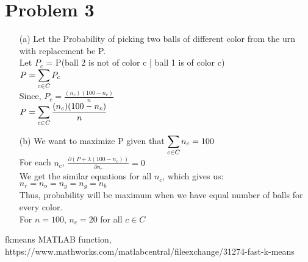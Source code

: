 \documentclass[fleqn]{article}
\begin{document}
\section{Problem 3}
\begin{itemize}
        \item[(a)] 
                Let the Probability of picking two balls of different color from
                the urn with replacement be P. \\
                Let $P_c$ = P(ball 2 is not of color c \big| ball 1 is of color c)\\
                $P = \smashoperator{\sum_{c \in C}} P_c$\\
                Since, $P_c = \frac{(n_c)(100 - n_c)}{n}$\\
                $P = \smashoperator{\sum_{c \in C}} \frac{(n_c)(100 - n_c)}{n}$
        \item[(b)]
                We want to maximize P given that $\smashoperator{\sum_{c \in C}} n_c = 100$\\
                For each $n_c$, $\frac{\partial (P + \lambda(100 - n_c))}{\partial n_c} = 0$\\
                We get the similar equations for all $n_c$, which gives us:\\
                $n_r = n_o = n_y = n_g = n_b$\\
                Thus, probability will be maximum when we have equal number of balls for every color. \\
                For $n = 100$, $n_c = 20$ for all $c \in C$
\end{itemize}
\begin{thebibliography}{99}
         fkmeans MATLAB function, https://www.mathworks.com/matlabcentral/fileexchange/31274-fast-k-means
\end{thebibliography}
\end{document}
